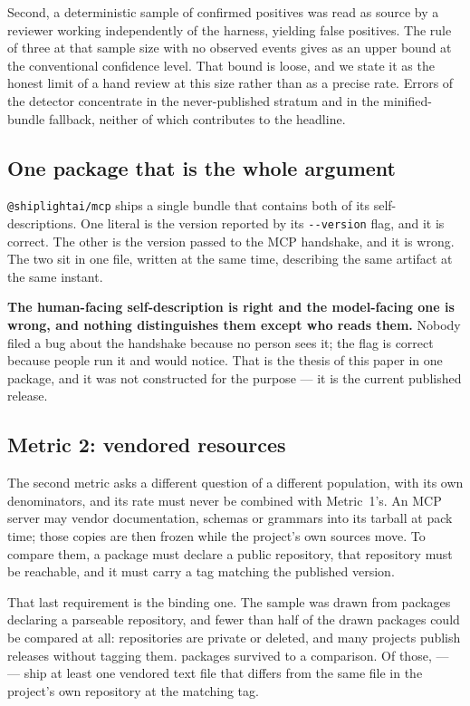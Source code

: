 \documentclass[10pt,journal,compsoc]{IEEEtran}
\begin{document}
Second, a deterministic sample of \factEcoFpSample{} confirmed positives was read as source by
a reviewer working independently of the harness, yielding \factEcoFpFound{} false positives.
The rule of three at that sample size with no observed events gives
\factEcoFpUpperBound{} as an upper bound at the conventional confidence level. That bound is loose, and we state it as the honest limit of a hand
review at this size rather than as a precise rate. Errors of the detector concentrate in the
never-published stratum and in the minified-bundle fallback, neither of which contributes to
the headline.

\subsection{One package that is the whole argument}

\texttt{@shiplightai/mcp} ships a single bundle that contains both of its self-descriptions. One
literal is the version reported by its \texttt{-{}-version} flag, and it is correct. The other
is the version passed to the MCP handshake, and it is wrong. The two sit in one file, written at
the same time, describing the same artifact at the same instant.

\textbf{The human-facing self-description is right and the model-facing one is wrong, and
nothing distinguishes them except who reads them.} Nobody filed a bug about the handshake
because no person sees it; the flag is correct because people run it and would notice. That is
the thesis of this paper in one package, and it was not constructed for the purpose --- it is
the current published release.

\subsection{Metric 2: vendored resources}\label{sec:metrictwo}

The second metric asks a different question of a different population, with its own
denominators, and its rate must never be combined with Metric~1's. An MCP server may vendor
documentation, schemas or grammars into its tarball at pack time; those copies are then frozen
while the project's own sources move. To compare them, a package must declare a public
repository, that repository must be reachable, and it must carry a tag matching the published
version.

That last requirement is the binding one. The sample was drawn from packages declaring a
parseable repository, and fewer than half of the drawn packages could be compared at all:
repositories are private or deleted, and many projects publish releases without tagging them.
\factEcoMTwoCompared{} packages survived to a comparison. Of those,
\factEcoMTwoDiffer{} --- \factEcoMTwoDifferPct{} --- ship at least one vendored text file that
differs from the same file in the project's own repository at the matching tag.
\end{document}
